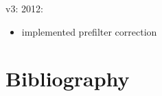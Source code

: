 \documentclass[a4paper,12pt]{article}
\begin{document}
v3: 2012:
\begin{itemize}
\item implemented prefilter correction
\end{itemize}

\section{Bibliography}
\end{document}
